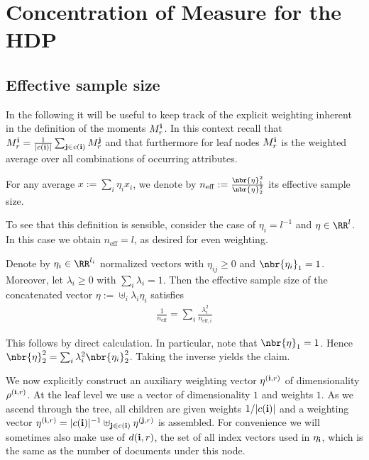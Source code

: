\documentclass[twoside,11pt]{article}
\newcommand{\ib}{{\bf i}}
\newcommand{\jb}{{\bf j}}
\begin{document}
{\section{Concentration of Measure for the HDP}

\subsection{Effective sample size}

In the following it will be useful to keep track of the explicit
weighting inherent in the definition of the moments $M_r^\ib$. In this
context recall that $M_r^{\ib} = \frac{1}{|c(\ib)|} \sum_{\jb \in
  c(\ib)}  M_r^\jb$ and that furthermore for leaf nodes $M_r^\ib$ is the weighted
average over all combinations of occurring attributes. 


\begin{definition}
  For any average $x := \sum_i \eta_i x_i$, we denote by 
  $n_\mathrm{eff} := \frac{\nbr{\eta}_1^2}{\nbr{\eta}_2^2}$ its
  effective sample size.
\end{definition}
%
To see that this definition is sensible, consider the case of $\eta_i
= l^{-1}$ and $\eta \in \RR^l$. In this case we obtain $n_\mathrm{eff}
= l$, as desired for even weighting. 
%
\begin{lemma}
  Denote by $\eta_i \in \RR^{l_i}$ normalized vectors with $\eta_{ij}
  \geq 0$ and $\nbr{\eta_i}_1 = 1$. Moreover, let $\lambda_i \geq 0$
  with $\sum_i \lambda_i = 1$. Then the effective sample size of the
  concatenated vector $\eta := \uplus_{i} \lambda_i \eta_i$ satisfies
  \begin{align*}
    \frac{1}{n_{\mathrm{eff}}} = \sum_i \frac{\lambda_i^2}{n_{\mathrm{eff},i}}
  \end{align*}
\end{lemma}
This follows by direct calculation. In particular, note that
$\nbr{\eta}_1=1$. Hence $\nbr{\eta}_2^2 = \sum_i \lambda_i^2
\nbr{\eta_i}_2^2$. Taking the inverse yields the claim. 

We now explicitly construct an auxiliary weighting vector
$\eta^{(\ib,r)}$ of dimensionality $\rho^{(\ib,r)}$. At the leaf level we
use a vector of dimensionality $1$ and weights
$1$. As we ascend through the tree, all children are
given weights $1/|c(\ib)|$ and a weighting vector $\eta^{(\ib,r)} =
|c(\ib)|^{-1} \uplus_{\jb \in c(\ib)} \eta^{(\jb,r)}$ is assembled. For
convenience we will sometimes also make use of $d(\ib,r)$, the set of
all index vectors used in $\eta_\ib$, which is the same as the number of documents under this node. 

}
\end{document}
